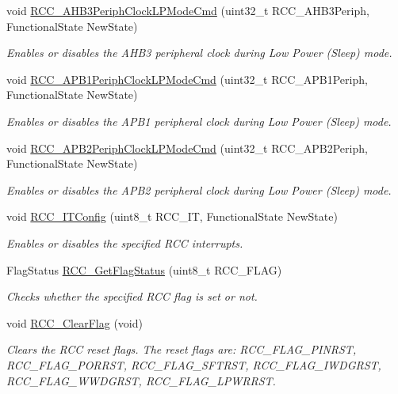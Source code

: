 \begin{DoxyCompactItemize}
void \hyperlink{group___r_c_c_ga4e1df07cdfd81c068902d9d35fcc3911}{R\+C\+C\+\_\+\+A\+H\+B3\+Periph\+Clock\+L\+P\+Mode\+Cmd} (uint32\+\_\+t R\+C\+C\+\_\+\+A\+H\+B3\+Periph, Functional\+State New\+State)
\begin{DoxyCompactList}\small\item\em Enables or disables the A\+H\+B3 peripheral clock during Low Power (Sleep) mode. \end{DoxyCompactList}\item 
void \hyperlink{group___r_c_c_ga84dd64badb84768cbcf19e241cadff50}{R\+C\+C\+\_\+\+A\+P\+B1\+Periph\+Clock\+L\+P\+Mode\+Cmd} (uint32\+\_\+t R\+C\+C\+\_\+\+A\+P\+B1\+Periph, Functional\+State New\+State)
\begin{DoxyCompactList}\small\item\em Enables or disables the A\+P\+B1 peripheral clock during Low Power (Sleep) mode. \end{DoxyCompactList}\item 
void \hyperlink{group___r_c_c_ga30365b9e0b4c5d7e98c2675c862ddd7e}{R\+C\+C\+\_\+\+A\+P\+B2\+Periph\+Clock\+L\+P\+Mode\+Cmd} (uint32\+\_\+t R\+C\+C\+\_\+\+A\+P\+B2\+Periph, Functional\+State New\+State)
\begin{DoxyCompactList}\small\item\em Enables or disables the A\+P\+B2 peripheral clock during Low Power (Sleep) mode. \end{DoxyCompactList}\item 
void \hyperlink{group___r_c_c_gaa953aa226e9ce45300d535941e4dfe2f}{R\+C\+C\+\_\+\+I\+T\+Config} (uint8\+\_\+t R\+C\+C\+\_\+\+IT, Functional\+State New\+State)
\begin{DoxyCompactList}\small\item\em Enables or disables the specified R\+CC interrupts. \end{DoxyCompactList}\item 
Flag\+Status \hyperlink{group___r_c_c_ga2897bdc52f272031c44fb1f72205d295}{R\+C\+C\+\_\+\+Get\+Flag\+Status} (uint8\+\_\+t R\+C\+C\+\_\+\+F\+L\+AG)
\begin{DoxyCompactList}\small\item\em Checks whether the specified R\+CC flag is set or not. \end{DoxyCompactList}\item 
void \hyperlink{group___r_c_c_ga53f909dbb15a54124419084ebda97d72}{R\+C\+C\+\_\+\+Clear\+Flag} (void)
\begin{DoxyCompactList}\small\item\em Clears the R\+CC reset flags. The reset flags are\+: R\+C\+C\+\_\+\+F\+L\+A\+G\+\_\+\+P\+I\+N\+R\+ST, R\+C\+C\+\_\+\+F\+L\+A\+G\+\_\+\+P\+O\+R\+R\+ST, R\+C\+C\+\_\+\+F\+L\+A\+G\+\_\+\+S\+F\+T\+R\+ST, R\+C\+C\+\_\+\+F\+L\+A\+G\+\_\+\+I\+W\+D\+G\+R\+ST, R\+C\+C\+\_\+\+F\+L\+A\+G\+\_\+\+W\+W\+D\+G\+R\+ST, R\+C\+C\+\_\+\+F\+L\+A\+G\+\_\+\+L\+P\+W\+R\+R\+ST. \end{DoxyCompactList}\item 

\end{DoxyCompactItemize}
